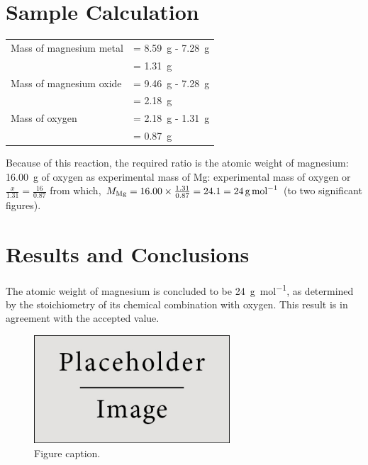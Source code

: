 \documentclass{article}
\begin{document}


\section{Sample Calculation}

\begin{tabular}{ll}
Mass of magnesium metal & = \SI{8.59}{\gram} - \SI{7.28}{\gram}\\
& = \SI{1.31}{\gram}\\
Mass of magnesium oxide & = \SI{9.46}{\gram} - \SI{7.28}{\gram}\\
& = \SI{2.18}{\gram}\\
Mass of oxygen & = \SI{2.18}{\gram} - \SI{1.31}{\gram}\\
& = \SI{0.87}{\gram}
\end{tabular}

Because of this reaction, the required ratio is the atomic weight of magnesium: \SI{16.00}{\gram} of oxygen as experimental mass of Mg: experimental mass of oxygen or $\frac{x}{1.31}=\frac{16}{0.87}$ from which, $M_{\ce{Mg}} = 16.00 \times \frac{1.31}{0.87} = 24.1 = \SI{24}{\gram\per\mole}$ (to two significant figures).


\section{Results and Conclusions}

The atomic weight of magnesium is concluded to be \SI{24}{\gram\per\mol}, as determined by the stoichiometry of its chemical combination with oxygen. This result is in agreement with the accepted value.

\begin{figure}[h]
\begin{center}
\includegraphics[width=0.65\textwidth]{placeholder} %
\caption{Figure caption.}
\end{center}
\end{figure}
\end{document}
